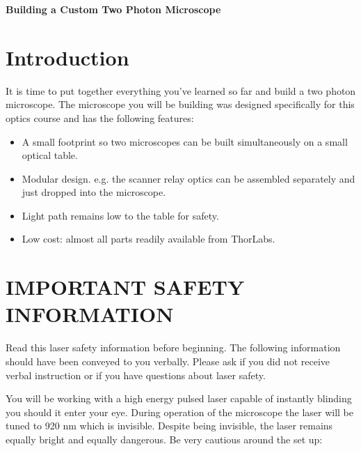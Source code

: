 \documentclass[a4paper]{report}
\begin{document}
\setcounter{secnumdepth}{2}

\begin{center}
\textbf{\Large{Building a Custom Two Photon Microscope}}
\end{center}

\section{Introduction}
It is time to put together everything you've learned so far and build a two photon microscope. 
The microscope you will be building was designed specifically for this optics course and has the following features:

\begin{itemize}
\item A small footprint so two microscopes can be built simultaneously on a small optical table.
\item Modular design. e.g. the scanner relay optics can be assembled separately and just dropped into the microscope.
\item Light path remains low to the table for safety.
\item Low cost: almost all parts readily available from ThorLabs.
\end{itemize}


\section{IMPORTANT SAFETY INFORMATION}
Read this laser safety information before beginning. 
The following information should have been conveyed to you verbally. 
Please ask if you did not receive verbal instruction or if you have questions about laser safety. 

You will be working with a high energy pulsed laser capable of instantly blinding you should it enter your eye. 
During operation of the microscope the laser will be tuned to 920 nm which is invisible. 
Despite being invisible, the laser remains equally bright and equally dangerous.
Be very cautious around the set up:
\end{document}

